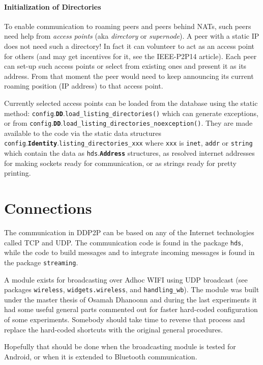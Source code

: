 \documentclass{book}
\newcommand{\pkg}[1]{{\tt #1}}
\newcommand{\cls}[1]{{\tt\bf #1}}
\newcommand{\mth}[1]{{\tt #1}}
\newcommand{\mmb}[1]{{\tt #1}}
\begin{document}
\paragraph{Initialization of Directories}
To enable communication to roaming peers and peers behind NATs, such peers need help from {\em access points} (aka {\em directory} or {\em supernode}).
A peer with a static IP does not need such a directory! In fact it can volunteer to act as an access point for others
(and may get incentives for it, see the IEEE-P2P14 article).
Each peer can set-up such access points or select from existing ones and present it as its address.
From that moment the peer would need to keep announcing its current roaming position (IP address) to that access point.

Currently selected access points can be loaded from the database using the static method:
\pkg{config}.\cls{DD}.\mth{load\_listing\_directories()} which can generate exceptions, or from
\pkg{config}.\cls{DD}.\mth{load\_listing\_directories\_noexception()}. They are made available to
the code via the static data structures \pkg{config}.\cls{Identity}.\mmb{listing\_directories\_xxx} where \mmb{xxx} is \mmb{inet}, \mmb{addr} or \mmb{string} which contain the data
as \pkg{hds}.\cls{Address} structures, as resolved internet addresses for making sockets ready for communication, or as strings ready for pretty printing.

\section{Connections}
The communication in DDP2P can be based on any of the Internet technologies called TCP and UDP. The communication code is found in the package \pkg{hds}, while
the code to build messages and to integrate incoming  messages is found in the package \pkg{streaming}.

A module exists for broadcasting over Adhoc WIFI using UDP broadcast (see packages \pkg{wireless}, \pkg{widgets.wireless}, and \pkg{handling\_wb}).
The module was built under the master thesis of Osamah Dhanoonn and during the last experiments it had some useful
general parts commented
out for faster hard-coded configuration of some experiments. Somebody should take time to reverse that process and replace the
hard-coded shortcuts with the original general procedures.

Hopefully that should be done when the broadcasting module is tested for Android, or when it is extended to Bluetooth communication.
\end{document}
